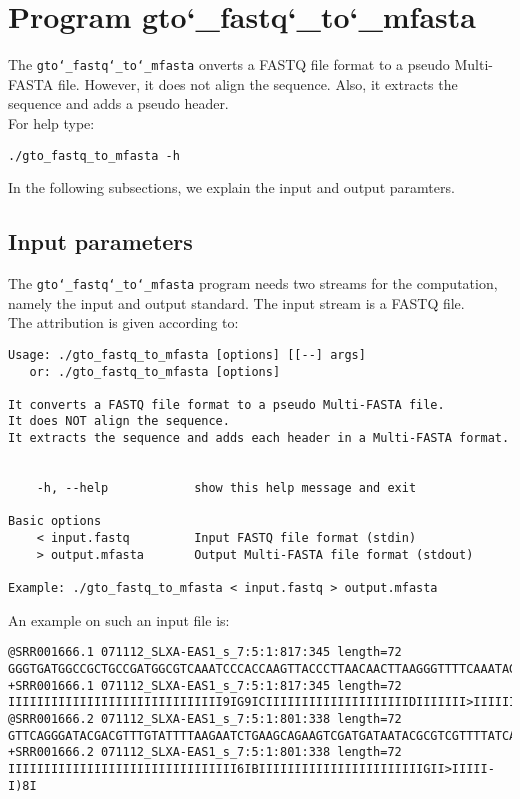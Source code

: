 \section{Program gto\char`_fastq\char`_to\char`_mfasta}
The \texttt{gto\char`_fastq\char`_to\char`_mfasta} onverts a FASTQ file format to a pseudo Multi-FASTA file. However, it does not align the sequence. Also, it extracts the sequence and adds a pseudo header.\\
For help type:
\begin{lstlisting}
./gto_fastq_to_mfasta -h
\end{lstlisting}
In the following subsections, we explain the input and output paramters.

\subsection*{Input parameters}

The \texttt{gto\char`_fastq\char`_to\char`_mfasta} program needs two streams for the computation,
namely the input and output standard. The input stream is a FASTQ file.\\
The attribution is given according to:
\begin{lstlisting}
Usage: ./gto_fastq_to_mfasta [options] [[--] args]
   or: ./gto_fastq_to_mfasta [options]

It converts a FASTQ file format to a pseudo Multi-FASTA file.
It does NOT align the sequence.
It extracts the sequence and adds each header in a Multi-FASTA format.


    -h, --help            show this help message and exit

Basic options
    < input.fastq         Input FASTQ file format (stdin)
    > output.mfasta       Output Multi-FASTA file format (stdout)

Example: ./gto_fastq_to_mfasta < input.fastq > output.mfasta
\end{lstlisting}
An example on such an input file is:
\begin{lstlisting}
@SRR001666.1 071112_SLXA-EAS1_s_7:5:1:817:345 length=72
GGGTGATGGCCGCTGCCGATGGCGTCAAATCCCACCAAGTTACCCTTAACAACTTAAGGGTTTTCAAATAGA
+SRR001666.1 071112_SLXA-EAS1_s_7:5:1:817:345 length=72
IIIIIIIIIIIIIIIIIIIIIIIIIIIIII9IG9ICIIIIIIIIIIIIIIIIIIIIDIIIIIII>IIIIII/
@SRR001666.2 071112_SLXA-EAS1_s_7:5:1:801:338 length=72
GTTCAGGGATACGACGTTTGTATTTTAAGAATCTGAAGCAGAAGTCGATGATAATACGCGTCGTTTTATCAT
+SRR001666.2 071112_SLXA-EAS1_s_7:5:1:801:338 length=72
IIIIIIIIIIIIIIIIIIIIIIIIIIIIIIII6IBIIIIIIIIIIIIIIIIIIIIIIIGII>IIIII-I)8I
\end{lstlisting}

